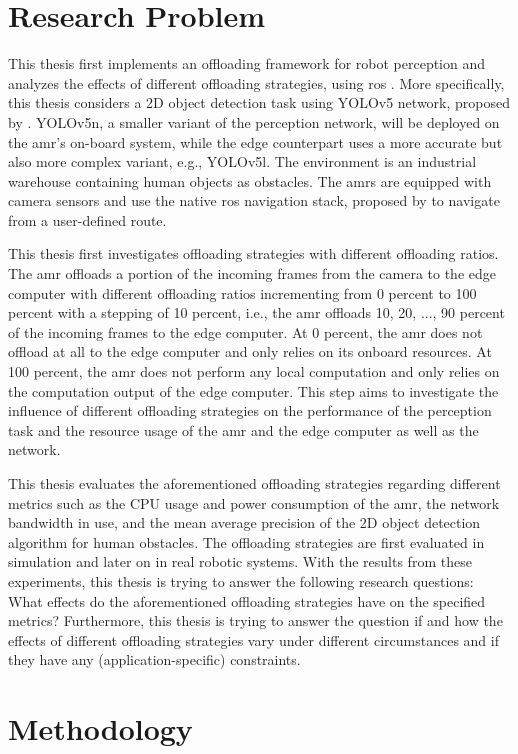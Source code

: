\section{Research Problem}

This thesis first implements an offloading framework for robot perception and analyzes the effects of different offloading strategies, using \gls{ros} \cite{Macenski2022}. More specifically, this thesis considers a 2D object detection task using YOLOv5 network, proposed by \citeauthor*{Jocher2020}. YOLOv5n, a smaller variant of the perception network, will be deployed on the \gls{amr}'s on-board system, while the edge counterpart uses a more accurate but also more complex variant, e.g., YOLOv5l. The environment is an industrial warehouse containing human objects as obstacles. The \glspl{amr} are equipped with camera sensors and use the native \gls{ros} navigation stack, proposed by \citeauthor*{Macenski2020} to navigate from a user-defined route. 

This thesis first investigates offloading strategies with different offloading ratios. The \gls{amr} offloads a portion of the incoming frames from the camera to the edge computer with different offloading ratios incrementing from 0 percent to 100 percent with a stepping of 10 percent, i.e., the \gls{amr} offloads 10, 20, ..., 90 percent of the incoming frames to the edge computer. At 0 percent, the \gls{amr} does not offload at all to the edge computer and only relies on its onboard resources. At 100 percent, the \gls{amr} does not perform any local computation and only relies on the computation output of the edge computer. This step aims to investigate the influence of different offloading strategies on the performance of the perception task and the resource usage of the \gls{amr} and the edge computer as well as the network. 


This thesis evaluates the aforementioned offloading strategies regarding different metrics such as the CPU usage and power consumption of the \gls{amr}, the network bandwidth in use, and the mean average precision of the 2D object detection algorithm for human obstacles. The offloading strategies are first evaluated in simulation and later on in real robotic systems. With the results from these experiments, this thesis is trying to answer the following research questions: What effects do the aforementioned offloading strategies have on the specified metrics? Furthermore, this thesis is trying to answer the question if and how the effects of different offloading strategies vary under different circumstances and if they have any (application-specific) constraints.


\section{Methodology}